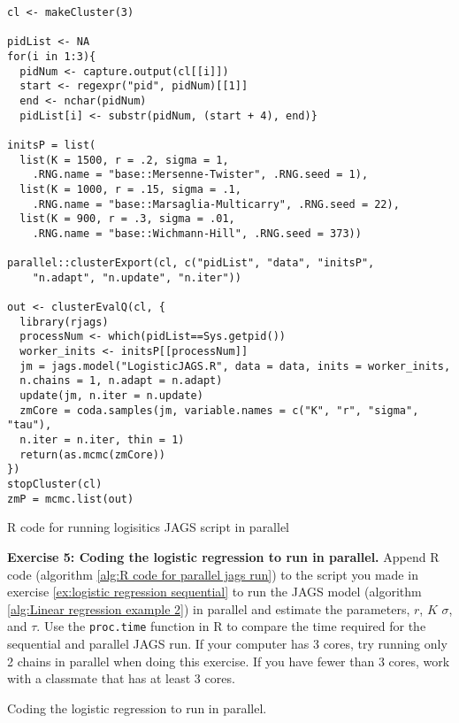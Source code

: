 \documentclass[12pt,english]{article}
\begin{document}
\begin{algorithm}
\begin{Verbatim}[frame=single]
cl <- makeCluster(3)

pidList <- NA
for(i in 1:3){
  pidNum <- capture.output(cl[[i]])
  start <- regexpr("pid", pidNum)[[1]]
  end <- nchar(pidNum)
  pidList[i] <- substr(pidNum, (start + 4), end)}

initsP = list(
  list(K = 1500, r = .2, sigma = 1, 
  	.RNG.name = "base::Mersenne-Twister", .RNG.seed = 1),
  list(K = 1000, r = .15, sigma = .1,
  	.RNG.name = "base::Marsaglia-Multicarry", .RNG.seed = 22),
  list(K = 900, r = .3, sigma = .01,
  	.RNG.name = "base::Wichmann-Hill", .RNG.seed = 373))

parallel::clusterExport(cl, c("pidList", "data", "initsP", 
	"n.adapt", "n.update", "n.iter"))

out <- clusterEvalQ(cl, {
  library(rjags)
  processNum <- which(pidList==Sys.getpid())
  worker_inits <- initsP[[processNum]]
  jm = jags.model("LogisticJAGS.R", data = data, inits = worker_inits, 
  n.chains = 1, n.adapt = n.adapt)
  update(jm, n.iter = n.update)
  zmCore = coda.samples(jm, variable.names = c("K", "r", "sigma", "tau"), 
  n.iter = n.iter, thin = 1)
  return(as.mcmc(zmCore))
}) 
stopCluster(cl)
zmP = mcmc.list(out)
\end{Verbatim}
\caption{R code for running logisitics JAGS script in parallel}
\label{alg:R code for parallel jags run}
\end{algorithm}

\belowcaptionskip=-40pt
\begin{exercise}
\begin{mdframed}
\doublespacing
\textbf{Exercise 5: Coding the logistic regression to run in parallel.}  Append R code (algorithm \ref{alg:R code for parallel jags run}) to the script you made in exercise \ref{ex:logistic regression sequential} to run the JAGS model (algorithm \ref{alg:Linear regression example 2}) in parallel and estimate the parameters, $r$, $K$ $\sigma$, and $\tau$. Use the \texttt{proc.time} function in R to compare the time required for the sequential and parallel JAGS run. If your computer has 3 cores, try running only 2 chains in parallel when doing this exercise. If you have fewer than 3 cores, work with a classmate that has at least 3 cores.
\end{mdframed}
\captionsetup{textformat=empty, labelformat=empty}
\caption[Coding the logistic regression to run in parallel]{Coding the logistic regression to run in parallel.}
\label{ex:logistic regression parallel}
\end{exercise}
\belowcaptionskip=0pt
\end{document}
